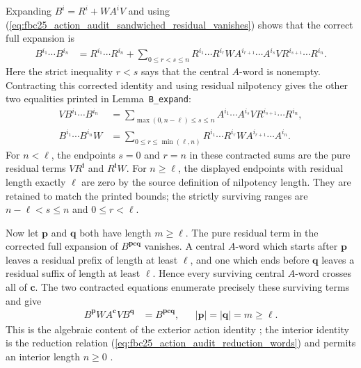 \documentclass{article}
\begin{document}
Expanding $B^i=R^i+WA^iV$ and using
(\ref{eq:fbc25_action_audit_sandwiched_residual_vanishes}) shows that the
correct full expansion is
\begin{align}
    B^{i_1}\cdots B^{i_n}
        &=R^{i_1}\cdots R^{i_n}
          +\sum_{0\leq r<s\leq n}
          R^{i_1}\cdots R^{i_r}
          W A^{i_{r+1}}\cdots A^{i_s}V
          R^{i_{s+1}}\cdots R^{i_n}.
    \label{eq:fbc25_action_audit_full_residual_expansion}
\end{align}
Here the strict inequality $r<s$ says that the central $A$-word is nonempty.
Contracting this corrected identity and using residual nilpotency gives the
other two equalities printed in Lemma~\texttt{B\_expand}:
\begin{align}
    V B^{i_1}\cdots B^{i_n}
        &=\sum_{\max(0,n-\ell)\leq s\leq n}
          A^{i_1}\cdots A^{i_s}V
          R^{i_{s+1}}\cdots R^{i_n},
    \label{eq:fbc25_action_audit_left_residual_expansion}\\
    B^{i_1}\cdots B^{i_n}W
        &=\sum_{0\leq r\leq\min(\ell,n)}
          R^{i_1}\cdots R^{i_r}W
          A^{i_{r+1}}\cdots A^{i_n}.
    \label{eq:fbc25_action_audit_right_residual_expansion}
\end{align}
For $n<\ell$, the endpoints $s=0$ and $r=n$ in these contracted sums are the
pure residual terms $VR^{\mathbf i}$ and $R^{\mathbf i}W$.  For
$n\geq\ell$, the displayed endpoints with residual length exactly $\ell$
are zero by the source definition of nilpotency length.  They are retained to
match the printed bounds; the strictly surviving ranges are
$n-\ell<s\leq n$ and $0\leq r<\ell$.

Now let $\mathbf p$ and $\mathbf q$ both have length $m\geq\ell$.  The pure
residual term in the corrected full expansion of
$B^{\mathbf p\mathbf c\mathbf q}$ vanishes.  A central $A$-word which starts
after $\mathbf p$ leaves a residual prefix of length at least $\ell$, and one
which ends before $\mathbf q$ leaves a residual suffix of length at least
$\ell$.  Hence every surviving central $A$-word crosses all of $\mathbf c$.
The two contracted equations enumerate precisely these surviving terms and
give
\begin{align}
    B^{\mathbf p}W A^{\mathbf c}V B^{\mathbf q}
        &=B^{\mathbf p\mathbf c\mathbf q},
        &&|\mathbf p|=|\mathbf q|=m\geq\ell.
    \label{eq:fbc25_action_audit_exterior_from_residual_expansion}
\end{align}
This is the algebraic content of the exterior action identity
; the interior identity
 is the reduction relation
(\ref{eq:fbc25_action_audit_reduction_words}) and permits an interior length
$n\geq0$ \cite[lines~1787--1870]{FrancoRubio2025MPUGauging}.
\end{document}

